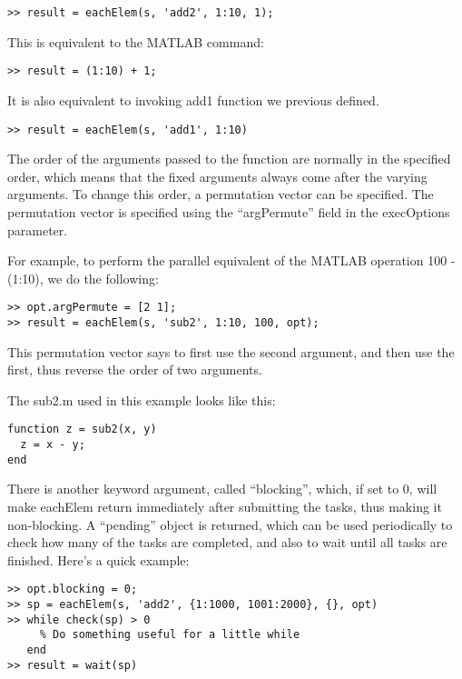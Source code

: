 \begin{verbatim}
>> result = eachElem(s, 'add2', 1:10, 1);
\end{verbatim}

This is equivalent to the MATLAB command:

\begin{verbatim}
>> result = (1:10) + 1;
\end{verbatim}

It is also equivalent to invoking add1 function we previous defined.
\begin{verbatim}
>> result = eachElem(s, 'add1', 1:10)
\end{verbatim}

The order of the arguments passed to the function are normally in the
specified order, which means that the fixed arguments always come after
the varying arguments.  To change this order, a permutation vector can
be specified.  The permutation vector is specified using the
``argPermute'' field in the execOptions parameter.

For example, to perform the parallel equivalent of the MATLAB operation
100 - (1:10), we do the following:

\begin{samepage}
\begin{verbatim}
>> opt.argPermute = [2 1];
>> result = eachElem(s, 'sub2', 1:10, 100, opt);
\end{verbatim}
\end{samepage}

This permutation vector says to first use the second argument, and then
use the first, thus reverse the order of two arguments.

The sub2.m used in this example looks like this:

\begin{samepage}
\begin{verbatim}
function z = sub2(x, y) 
  z = x - y;
end
\end{verbatim}
\end{samepage}

There is another keyword argument, called ``blocking'', which, if set to
0, will make eachElem return immediately after submitting the tasks,
thus making it non-blocking.  A ``pending'' object is returned, which can
be used periodically to check how many of the tasks are completed, and also
to wait until all tasks are finished.  Here's a quick example:

\begin{samepage}
\begin{verbatim}
>> opt.blocking = 0;
>> sp = eachElem(s, 'add2', {1:1000, 1001:2000}, {}, opt)
>> while check(sp) > 0
     % Do something useful for a little while
   end
>> result = wait(sp)
\end{verbatim}
\end{samepage}

